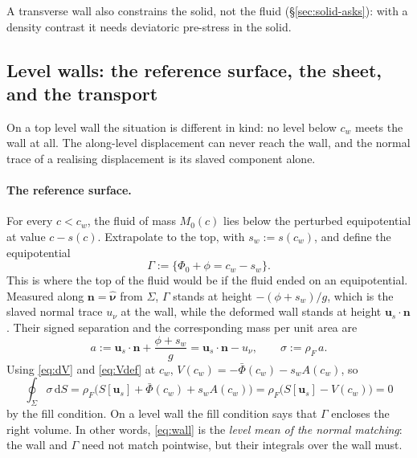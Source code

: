 \documentclass[11pt]{article}
\theoremstyle{definition}
\theoremstyle{remark}
\newcommand{\bu}{\mathbf{u}}
\newcommand{\bn}{\mathbf{n}}
\newcommand{\dS}{\,\mathrm{d}S}
\newcommand{\nuh}{\hat{\boldsymbol{\nu}}}
\begin{document}
A transverse wall also constrains the solid, not the fluid
(\S\ref{sec:solid-asks}): with a density contrast it needs deviatoric
pre-stress in the solid.

\subsection{Level walls: the reference surface, the sheet, and the transport}
\label{sec:levelwalls}
\label{sec:wall}

On a top level wall the situation is different in kind: no level below
$c_w$ meets the wall at all. The along-level displacement can never
reach the wall, and the normal trace of a realising displacement is
its slaved component alone.

\paragraph{The reference surface.} For every $c < c_w$, the fluid of
mass $M_0(c)$ lies below the perturbed equipotential at value $c -
s(c)$. Extrapolate to the top, with $s_w := s(c_w)$, and define the
equipotential
\begin{equation*}
  \Gamma := \{\Phi_0 + \phi = c_w - s_w\} .
\end{equation*}
This is where the top of the fluid would be if the fluid ended on an
equipotential. Measured along $\bn = \nuh$ from $\Sigma$, $\Gamma$
stands at height $-(\phi + s_w)/g$, which is the slaved normal trace
$u_\nu$ at the wall, while the deformed wall stands at height
$\bu_s\cdot\bn$. Their signed separation and the corresponding mass
per unit area are
\begin{equation}
  a := \bu_s\cdot\bn + \frac{\phi + s_w}{g} = \bu_s\cdot\bn - u_\nu,
  \qquad
  \sigma := \rho_F\,a .
  \label{eq:sigma}
\end{equation}
Using \eqref{eq:dV} and \eqref{eq:Vdef} at $c_w$, $V(c_w) =
-\bar\Phi(c_w) - s_wA(c_w)$, so
\begin{equation}
  \oint_\Sigma\sigma\dS
  = \rho_F\bigl(S[\bu_s] + \bar\Phi(c_w) + s_wA(c_w)\bigr)
  = \rho_F\bigl(S[\bu_s] - V(c_w)\bigr) = 0
  \label{eq:wall}
\end{equation}
by the fill condition. On a level wall the fill condition says that
$\Gamma$ encloses the right volume. In other words,
\eqref{eq:wall} is the \emph{level mean of the normal matching}: the
wall and $\Gamma$ need not match pointwise, but their integrals over
the wall must.
\end{document}

